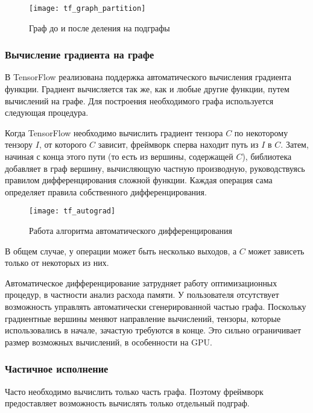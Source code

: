 \begin{figure}[h]
    \centering
    \texttt{[image: tf\_graph\_partition]}
    \caption{Граф до и после деления на подграфы}
    \label{fig:tf_graph_partition}
\end{figure}

\subsubsection{Вычисление градиента на графе}

В TensorFlow реализована поддержка автоматического вычисления градиента функции.
Градиент вычисляется так же, как и любые другие функции, путем вычислений на
графе. Для построения необходимого графа используется следующая процедура.

Когда TensorFlow необходимо вычислить градиент тензора $C$ по некоторому
тензору $I$, от которого $C$ зависит, фреймворк сперва находит путь из
$I$ в $C$. Затем, начиная с конца этого пути (то есть из вершины, содержащей $C$),
библиотека добавляет в граф вершину, вычисляющую частную производную,
руководствуясь правилом дифференцирования сложной функции. Каждая операция сама
определяет правила собственного дифференцирования.

\begin{figure}[h]
    \centering
    \texttt{[image: tf\_autograd]}
    \caption{Работа алгоритма автоматического дифференцирования}
    \label{fig:tf_autograd}
\end{figure}

В общем случае, у операции может быть несколько выходов, а $C$ может зависеть
только от некоторых из них.

Автоматическое дифференцирование затрудняет работу оптимизационных процедур,
в частности анализ расхода памяти. У пользователя отсутствует возможность
управлять автоматически сгенерированной частью графа. Поскольку градиентные
вершины меняют направление вычислений, тензоры, которые использовались в начале,
зачастую требуются в конце. Это сильно ограничивает размер возможных вычислений,
в особенности на GPU.

\subsubsection{Частичное исполнение}

Часто необходимо вычислить только часть графа. Поэтому фреймворк предоставляет
возможность вычислять только отдельный подграф.

